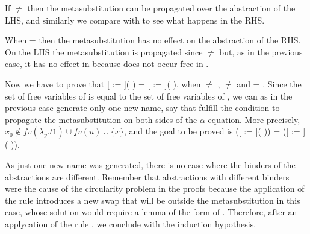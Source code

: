 If  \ensuremath{\not=}  then the metasubstitution can be propagated over the abstraction of the LHS, and similarly we compare  with  to see what happens in the RHS. 
\begin{coqdoccode}
\end{coqdoccode}
When  =  then the metasubstitution has no effect on the abstraction of the RHS. On the LHS the metasubstitution is propagated since  \ensuremath{\not=}  but, as in the previous case, it has no effect in  because  does not occur free in .
\begin{coqdoccode}
\end{coqdoccode}
Now we have to prove that [ := ](  ) = [ := ](  ), when  \ensuremath{\not=} ,  \ensuremath{\not=}  and    =   . Since the set of free variables of    is equal to the set of free variables of   , we can as in the previous case generate only one new name, say  that fulfill the condition to propagate the metasubstitution on both sides of the $\alpha$-equation. More precisely, $x_0 \notin fv(\lambda_y.t1) \cup fv(u) \cup \{x\}$, and the goal to be proved is   ([ := ](   )) =   ([ := ](   )).
\begin{coqdoccode}
\end{coqdoccode}
As just one new name was generated, there is no case where the binders of the abstractions are different. Remember that abstractions with different binders were the cause of the circularity problem in the proofs because the application of the rule  introduces a new swap that will be outside the metasubstitution in this case, whose solution would require a lemma of the form of . Therefore, after an applycation of the rule , we conclude with the induction hypothesis.
